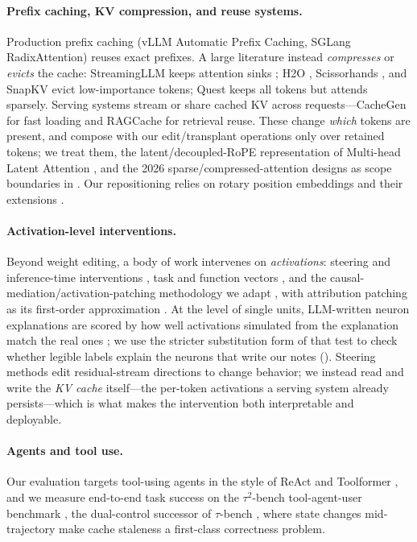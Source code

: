 \paragraph{Prefix caching, KV compression, and reuse systems.} Production prefix caching (vLLM Automatic
Prefix Caching, SGLang RadixAttention) reuses exact prefixes. A large literature instead \emph{compresses}
or \emph{evicts} the cache: StreamingLLM keeps attention sinks \citep{xiao2024streamingllm}; H2O
\citep{zhang2023h2o}, Scissorhands \citep{liu2023scissorhands}, and SnapKV \citep{li2024snapkv} evict
low-importance tokens; Quest \citep{tang2024quest} keeps all tokens but attends sparsely. Serving systems
stream or share cached KV across requests---CacheGen \citep{liu2024cachegen} for fast loading and RAGCache
\citep{jin2024ragcache} for retrieval reuse. These change \emph{which} tokens are present, and compose with
our edit/transplant operations only over retained tokens; we treat them, the latent/decoupled-RoPE
representation of Multi-head Latent Attention \citep{deepseekv2,deepseekv3}, and the 2026
sparse/compressed-attention designs as scope boundaries in . Our repositioning relies on
rotary position embeddings \citep{su2024rope} and their extensions \citep{peng2024yarn}.

\paragraph{Activation-level interventions.} Beyond weight editing, a body of work intervenes on
\emph{activations}: steering and inference-time interventions \citep{li2023iti}, task and function vectors
\citep{ilharco2023taskvectors,todd2024functionvectors}, and the causal-mediation/activation-patching
methodology we adapt \citep{vig2020causal}, with attribution patching as its first-order approximation
\citep{kramar2024atp}. At the level of single units, LLM-written neuron explanations are scored by how well
activations simulated from the explanation match the real ones \citep{bills2023explain}; we use the
stricter substitution form of that test to check whether legible labels explain the neurons that write our
notes (). Steering methods edit residual-stream directions to change behavior; we
instead read and write the \emph{KV cache} itself---the per-token activations a serving system already
persists---which is what makes the intervention both interpretable and deployable.

\paragraph{Agents and tool use.} Our evaluation targets tool-using agents in the style of ReAct
\citep{yao2023react} and Toolformer \citep{schick2023toolformer}, and we measure end-to-end task success on
the $\tau^2$-bench tool-agent-user benchmark \citep{barres2025tau2}, the dual-control successor of
$\tau$-bench \citep{yao2024taubench}, where state changes mid-trajectory make
cache staleness a first-class correctness problem.

